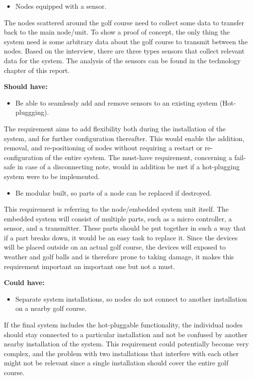 \begin{itemize}
\item Nodes equipped with a sensor.
\end{itemize}
The nodes scattered around the golf course need to collect some data to transfer back to the main node/unit. To show a proof of concept, the only thing the system need is some arbitrary data about the golf course to transmit between the nodes. Based on the interview, there are three types sensors that collect relevant data for the system. The analysis of the sensors can be found in the technology chapter of this report.


\textbf{Should have:}
\begin{itemize}
\item Be able to seamlessly add and remove sensors to an existing system (Hot-pluggging).
\end{itemize}
The requirement aims to add flexibility both during the installation of the system, and for further configuration thereafter. This would enable the addition, removal, and re-positioning of nodes without requiring a restart or re-configuration of the entire system. The must-have requirement, concerning a fail-safe in case of a disconnecting note, would in addition be met if a hot-plugging system were to be implemented.


\begin{itemize}
\item Be modular built, so parts of a node can be replaced if destroyed.
\end{itemize}
This requirement is referring to the node/embedded system unit itself. The embedded system will consist of multiple parts, such as a micro controller, a sensor, and a transmitter. These parts should be put together in such a way that if a part breaks down, it would be an easy task to replace it. Since the devices will be placed outside on an actual golf course, the devices will exposed to weather and golf balls and is therefore prone to taking damage, it makes this requirement important an important one but not a must.


\textbf{Could have:}
\begin{itemize}
\item Separate system installations, so nodes do not connect to another installation on a nearby golf course.
\end{itemize}
If the final system includes the hot-pluggable functionality, the individual nodes should stay connected to a particular installation and not be confused by another nearby installation of the system. This requirement could potentially become very complex, and the problem with two installations that interfere with each other might not be relevant since a single installation should cover the entire golf course.

